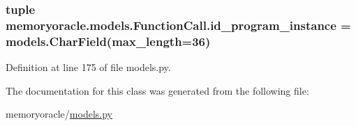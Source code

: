 \subsubsection[{id\+\_\+program\+\_\+instance}]{\setlength{\rightskip}{0pt plus 5cm}tuple memoryoracle.\+models.\+Function\+Call.\+id\+\_\+program\+\_\+instance = models.\+Char\+Field(max\+\_\+length=36)\hspace{0.3cm}{\ttfamily [static]}}\label{classmemoryoracle_1_1models_1_1FunctionCall_ab9399836b9c41f224159af0f9c862380}


Definition at line 175 of file models.\+py.



The documentation for this class was generated from the following file\+:\begin{DoxyCompactItemize}
\item 
memoryoracle/\hyperlink{models_8py}{models.\+py}\end{DoxyCompactItemize}
